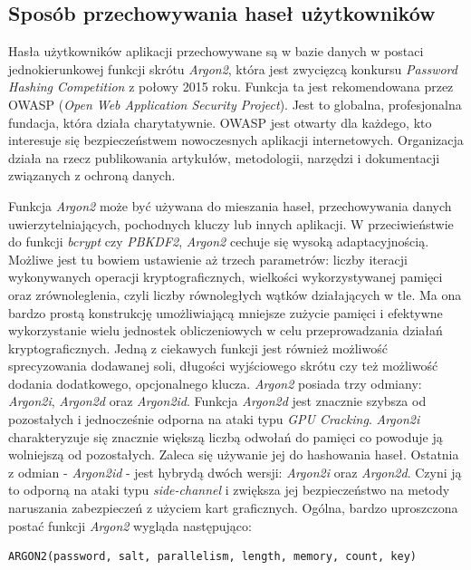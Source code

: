 \subsection{Sposób przechowywania haseł użytkowników}
Hasła użytkowników aplikacji przechowywane są w bazie danych w postaci jednokierunkowej funkcji skrótu \textit{Argon2}, która jest zwycięzcą konkursu \textit{Password Hashing Competition} z połowy 2015 roku. Funkcja ta jest rekomendowana przez OWASP (\textit{Open Web Application Security Project}). Jest to globalna, profesjonalna fundacja, która działa charytatywnie. OWASP jest otwarty dla każdego, kto interesuje się bezpieczeństwem nowoczesnych aplikacji internetowych. Organizacja działa na rzecz publikowania artykułów, metodologii, narzędzi i dokumentacji związanych z ochroną danych. 

Funkcja \textit{Argon2} może być używana do mieszania haseł, przechowywania danych uwierzytelniających, pochodnych kluczy lub innych aplikacji. W przeciwieństwie do funkcji \textit{bcrypt} czy \textit{PBKDF2}, \textit{Argon2} cechuje się wysoką adaptacyjnością. Możliwe jest tu bowiem ustawienie aż trzech parametrów: liczby iteracji wykonywanych operacji kryptograficznych, wielkości wykorzystywanej pamięci oraz zrównoleglenia, czyli liczby równoległych wątków działających w tle. Ma ona bardzo prostą konstrukcję umożliwiającą mniejsze zużycie pamięci i efektywne wykorzystanie wielu jednostek obliczeniowych w celu przeprowadzania działań kryptograficznych. Jedną z ciekawych funkcji jest również możliwość sprecyzowania dodawanej soli, długości wyjściowego skrótu czy też możliwość dodania dodatkowego, opcjonalnego klucza. \textit{Argon2} posiada trzy odmiany: \textit{Argon2i}, \textit{Argon2d} oraz \textit{Argon2id}. Funkcja \textit{Argon2d} jest znacznie szybsza od pozostałych i jednocześnie odporna na ataki typu \textit{GPU Cracking}. \textit{Argon2i} charakteryzuje się znacznie większą liczbą odwołań do pamięci co powoduje ją wolniejszą od pozostałych. Zaleca się używanie jej do hashowania haseł. Ostatnia z odmian - \textit{Argon2id} - jest hybrydą dwóch wersji: \textit{Argon2i} oraz \textit{Argon2d}. Czyni ją to odporną na ataki typu \textit{side-channel} i zwiększa jej bezpieczeństwo na metody naruszania zabezpieczeń z użyciem kart graficznych. Ogólna, bardzo uproszczona postać funkcji \textit{Argon2} wygląda następująco:

\begin{verbatim}
ARGON2(password, salt, parallelism, length, memory, count, key)
\end{verbatim}

